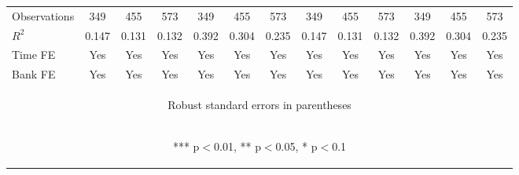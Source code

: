 \documentclass[]{article}
\begin{document}
\begin{center}
\begin{tabular}{lcccccccccccc}
Observations & 349 & 455 & 573 & 349 & 455 & 573 & 349 & 455 & 573 & 349 & 455 & 573 \\
$R^2$ & 0.147 & 0.131 & 0.132 & 0.392 & 0.304 & 0.235 & 0.147 & 0.131 & 0.132 & 0.392 & 0.304 & 0.235 \\
Time FE & Yes & Yes & Yes & Yes & Yes & Yes & Yes & Yes & Yes & Yes & Yes & Yes \\
 Bank FE & Yes & Yes & Yes & Yes & Yes & Yes & Yes & Yes & Yes & Yes & Yes & Yes \\ \hline
\multicolumn{13}{c}{\begin{footnotesize} Robust standard errors in parentheses\end{footnotesize}} \\
\multicolumn{13}{c}{\begin{footnotesize} *** p$<$0.01, ** p$<$0.05, * p$<$0.1\end{footnotesize}} \\
\end{tabular}
\end{center}
\end{document}
